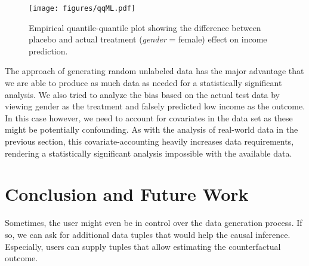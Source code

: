 \documentclass[acmsmall, nonacm, screen]{acmart} %
\begin{document}
\begin{figure}[htbp]
\texttt{[image: figures/qqML.pdf]}
\caption{Empirical quantile-quantile plot showing the difference between placebo and actual treatment (\textit{gender} = female) effect on income prediction.}
\label{fig:qqML}
\end{figure}

The approach of generating random unlabeled data has the major advantage that we are able to produce as much data as needed for a statistically significant analysis.
We also tried to analyze the bias based on the actual test data by viewing gender as the treatment and falsely predicted low income as the outcome. 
In this case however, we need to account for covariates in the data set as these might be potentially confounding.
As with the analysis of real-world data in the previous section, this covariate-accounting heavily increases data requirements, rendering a statistically significant analysis impossible with the available data.


\section{Conclusion and Future Work}

Sometimes, the user might even be in control over the data generation process. 
If so, we can ask for additional data tuples that would help the causal inference. Especially, users can supply tuples that allow estimating the counterfactual outcome.\\






\end{document}
